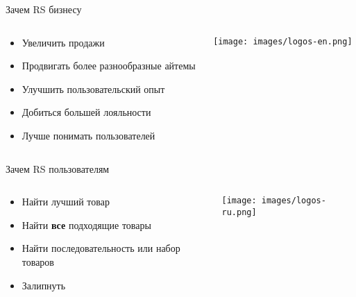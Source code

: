 \documentclass[11pt,aspectratio=169,handout]{beamer}
\begin{document}
\begin{frame}{Зачем RS бизнесу}

\begin{columns}

\begin{column}{0.45\textwidth}
   \begin{small}
    \begin{itemize}[<+->]
	\item Увеличить продажи
	\item Продвигать более разнообразные айтемы
	\item Улучшить пользовательский опыт
	\item Добиться большей лояльности
	\item Лучше понимать пользователей
	\end{itemize}
    \end{small}
\end{column}

\begin{column}{0.45\textwidth}
   \begin{center}
		\texttt{[image: images/logos-en.png]}
   \end{center}
\end{column}

\end{columns}

\end{frame}

\begin{frame}{Зачем RS пользователям}

\begin{columns}

\begin{column}{0.45\textwidth}
   \begin{small}
    \begin{itemize}[<+->]
	\item Найти лучший товар
	\item Найти {\bf все} подходящие товары
	\item Найти последовательность или набор товаров
	\item Залипнуть
	\end{itemize}
    \end{small}
\end{column}

\begin{column}{0.45\textwidth}
   \begin{center}
		\texttt{[image: images/logos-ru.png]}
   \end{center}
\end{column}

\end{columns}

\end{frame}
\end{document}
